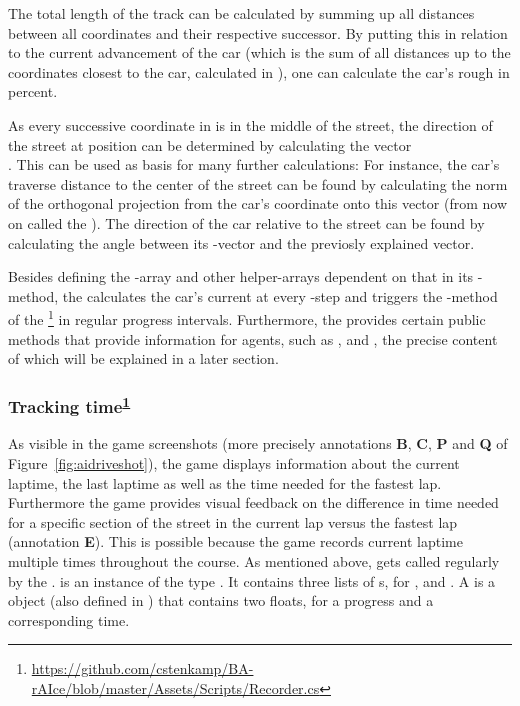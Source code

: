The total length of the track can be calculated by summing up all distances between all  coordinates and their respective successor. By putting this in relation to the current advancement of the car (which is the sum of all distances up to the coordinates closest to the car, calculated in ), one can calculate the car's rough   in percent.

As every successive coordinate in  is in the middle of the street, the direction of the street at position  can be determined by calculating the vector\\ . This can be used as basis for many further calculations: For instance, the car's traverse distance to the center of the street can be found by calculating the norm of the orthogonal projection from the car's coordinate onto this vector (from now on called the ). The direction of the car relative to the street can be found by calculating the angle between its -vector and the previosly explained vector.

Besides defining the -array and other helper-arrays dependent on that in its -method, the  calculates the car's current  at every -step and triggers the -method of the \footnote{\label{fn:rec}\url{https://github.com/cstenkamp/BA-rAIce/blob/master/Assets/Scripts/Recorder.cs}} in regular progress intervals. Furthermore, the  provides certain public methods that provide information for agents, such as ,  and , the precise content of which will be explained in a later section.

\subsubsection{Tracking time\textsuperscript{\ref{fn:rec}}}

As visible in the game screenshots (more precisely annotations \textbf{B}, \textbf{C}, \textbf{P} and \textbf{Q} of Figure~\ref{fig:aidriveshot}), the game displays information about the current laptime, the last laptime as well as the time needed for the fastest lap. Furthermore the game provides visual feedback on the difference in time needed for a specific section of the street in the current lap versus the fastest lap (annotation \textbf{E}). This is possible because the game records current laptime multiple times throughout the course. As mentioned above,  gets called regularly by the .  is an instance of the type . It contains three lists of s, for ,  and . A  is a  object (also defined in ) that contains two floats, for a progress and a corresponding time.

